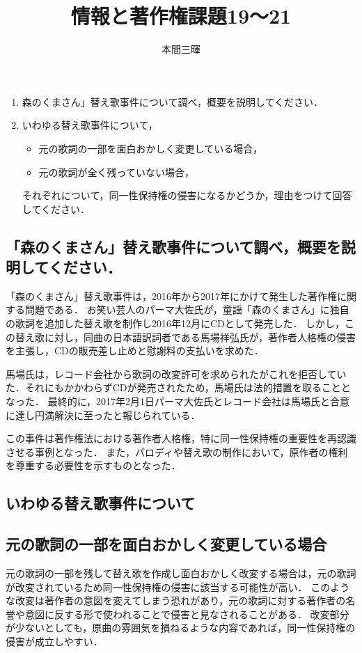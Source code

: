 \documentclass[titlepage,a4paper]{jsarticle}
\title{情報と著作権課題19〜21}
\author{本間三暉}
\begin{document}
\maketitle
\section{ }
\begin{enumerate}
  \item 森のくまさん」替え歌事件について調べ，概要を説明してください．
  \item いわゆる替え歌事件について，
        \begin{itemize}
          \item 元の歌詞の一部を面白おかしく変更している場合，
          \item 元の歌詞が全く残っていない場合，
        \end{itemize}
        それぞれについて，同一性保持権の侵害になるかどうか，理由をつけて回答してください．
\end{enumerate}
\subsection{「森のくまさん」替え歌事件について調べ，概要を説明してください．}
「森のくまさん」替え歌事件は，2016年から2017年にかけて発生した著作権に関する問題である．
お笑い芸人のパーマ大佐氏が，童謡「森のくまさん」に独自の歌詞を追加した替え歌を制作し2016年12月にCDとして発売した．
しかし，この替え歌に対し，同曲の日本語訳詞者である馬場祥弘氏が，著作者人格権の侵害を主張し，CDの販売差し止めと慰謝料の支払いを求めた．\cite{bear}

馬場氏は，レコード会社から歌詞の改変許可を求められたがこれを拒否していた．それにもかかわらずCDが発売されたため，馬場氏は法的措置を取ることとなった．
最終的に，2017年2月1日パーマ大佐氏とレコード会社は馬場氏と合意に達し円満解決に至ったと報じられている．\cite{bear2}

この事件は著作権法における著作者人格権，特に同一性保持権の重要性を再認識させる事例となった．
また，パロディや替え歌の制作において，原作者の権利を尊重する必要性を示すものとなった．
\subsection{いわゆる替え歌事件について}
\subsection*{元の歌詞の一部を面白おかしく変更している場合}
元の歌詞の一部を残して替え歌を作成し面白おかしく改変する場合は，元の歌詞が改変されているため同一性保持権の侵害に該当する可能性が高い．
このような改変は著作者の意図を変えてしまう恐れがあり，元の歌詞に対する著作者の名誉や意図に反する形で使われることで侵害と見なされることがある．
改変部分が少ないとしても，原曲の雰囲気を損ねるような内容であれば，同一性保持権の侵害が成立しやすい．
\end{document}
